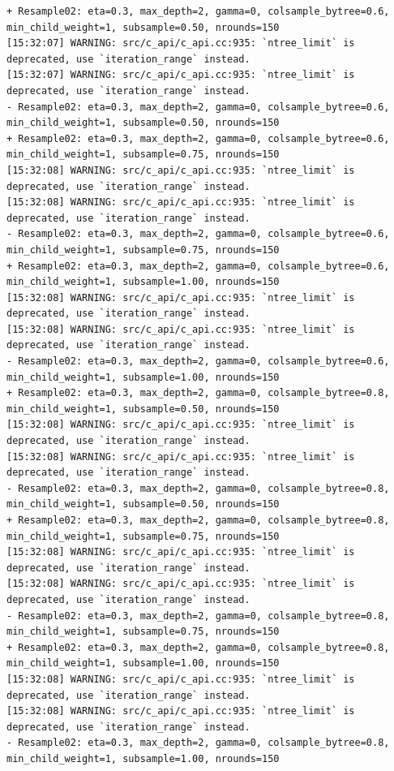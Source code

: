 \documentclass[
  letterpaper,
  DIV=11,
  numbers=noendperiod]{scrartcl}
\begin{document}
\begin{verbatim}
+ Resample02: eta=0.3, max_depth=2, gamma=0, colsample_bytree=0.6, min_child_weight=1, subsample=0.50, nrounds=150 
[15:32:07] WARNING: src/c_api/c_api.cc:935: `ntree_limit` is deprecated, use `iteration_range` instead.
[15:32:07] WARNING: src/c_api/c_api.cc:935: `ntree_limit` is deprecated, use `iteration_range` instead.
- Resample02: eta=0.3, max_depth=2, gamma=0, colsample_bytree=0.6, min_child_weight=1, subsample=0.50, nrounds=150 
+ Resample02: eta=0.3, max_depth=2, gamma=0, colsample_bytree=0.6, min_child_weight=1, subsample=0.75, nrounds=150 
[15:32:08] WARNING: src/c_api/c_api.cc:935: `ntree_limit` is deprecated, use `iteration_range` instead.
[15:32:08] WARNING: src/c_api/c_api.cc:935: `ntree_limit` is deprecated, use `iteration_range` instead.
- Resample02: eta=0.3, max_depth=2, gamma=0, colsample_bytree=0.6, min_child_weight=1, subsample=0.75, nrounds=150 
+ Resample02: eta=0.3, max_depth=2, gamma=0, colsample_bytree=0.6, min_child_weight=1, subsample=1.00, nrounds=150 
[15:32:08] WARNING: src/c_api/c_api.cc:935: `ntree_limit` is deprecated, use `iteration_range` instead.
[15:32:08] WARNING: src/c_api/c_api.cc:935: `ntree_limit` is deprecated, use `iteration_range` instead.
- Resample02: eta=0.3, max_depth=2, gamma=0, colsample_bytree=0.6, min_child_weight=1, subsample=1.00, nrounds=150 
+ Resample02: eta=0.3, max_depth=2, gamma=0, colsample_bytree=0.8, min_child_weight=1, subsample=0.50, nrounds=150 
[15:32:08] WARNING: src/c_api/c_api.cc:935: `ntree_limit` is deprecated, use `iteration_range` instead.
[15:32:08] WARNING: src/c_api/c_api.cc:935: `ntree_limit` is deprecated, use `iteration_range` instead.
- Resample02: eta=0.3, max_depth=2, gamma=0, colsample_bytree=0.8, min_child_weight=1, subsample=0.50, nrounds=150 
+ Resample02: eta=0.3, max_depth=2, gamma=0, colsample_bytree=0.8, min_child_weight=1, subsample=0.75, nrounds=150 
[15:32:08] WARNING: src/c_api/c_api.cc:935: `ntree_limit` is deprecated, use `iteration_range` instead.
[15:32:08] WARNING: src/c_api/c_api.cc:935: `ntree_limit` is deprecated, use `iteration_range` instead.
- Resample02: eta=0.3, max_depth=2, gamma=0, colsample_bytree=0.8, min_child_weight=1, subsample=0.75, nrounds=150 
+ Resample02: eta=0.3, max_depth=2, gamma=0, colsample_bytree=0.8, min_child_weight=1, subsample=1.00, nrounds=150 
[15:32:08] WARNING: src/c_api/c_api.cc:935: `ntree_limit` is deprecated, use `iteration_range` instead.
[15:32:08] WARNING: src/c_api/c_api.cc:935: `ntree_limit` is deprecated, use `iteration_range` instead.
- Resample02: eta=0.3, max_depth=2, gamma=0, colsample_bytree=0.8, min_child_weight=1, subsample=1.00, nrounds=150 

\end{verbatim}
\end{document}

